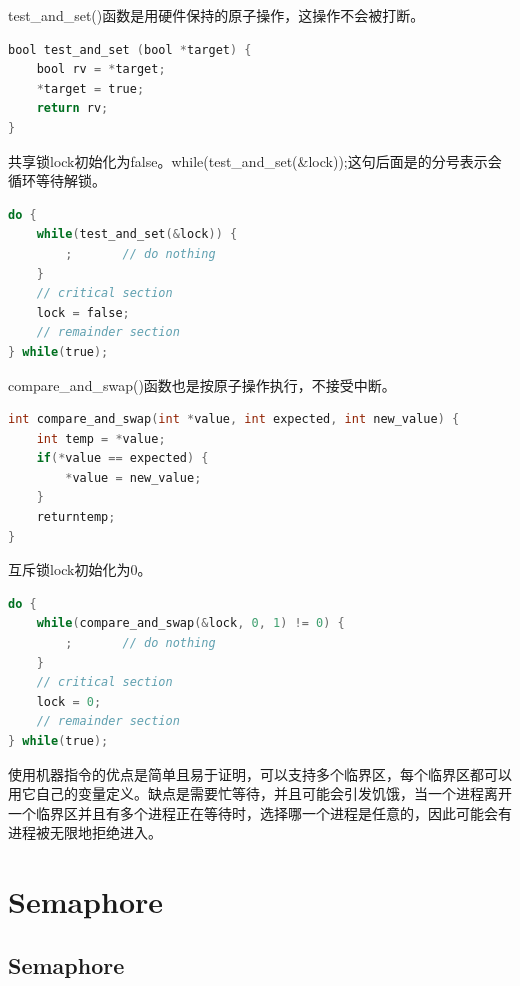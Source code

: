 test\_and\_set()函数是用硬件保持的原子操作，这操作不会被打断。

\vspace{-0.5cm}

\begin{lstlisting}[language=C]
bool test_and_set (bool *target) {
	bool rv = *target;
	*target = true;
	return rv;
}
\end{lstlisting}

共享锁lock初始化为false。while(test\_and\_set(\&lock));这句后面是的分号表示会循环等待解锁。

\vspace{-0.5cm}

\begin{lstlisting}[language=C]
do {
	while(test_and_set(&lock)) {
		;		// do nothing
	}
	// critical section
	lock = false;
	// remainder section
} while(true);
\end{lstlisting}

compare\_and\_swap()函数也是按原子操作执行，不接受中断。

\vspace{-0.5cm}

\begin{lstlisting}[language=C]
int compare_and_swap(int *value, int expected, int new_value) {
	int temp = *value;
	if(*value == expected) {
		*value = new_value;
	}
	returntemp;
}
\end{lstlisting}

互斥锁lock初始化为0。

\vspace{-0.5cm}

\begin{lstlisting}[language=C]
do {
	while(compare_and_swap(&lock, 0, 1) != 0) {
		;		// do nothing
	}
	// critical section
	lock = 0;
	// remainder section
} while(true);
\end{lstlisting}

使用机器指令的优点是简单且易于证明，可以支持多个临界区，每个临界区都可以用它自己的变量定义。缺点是需要忙等待，并且可能会引发饥饿，当一个进程离开一个临界区并且有多个进程正在等待时，选择哪一个进程是任意的，因此可能会有进程被无限地拒绝进入。

\newpage

\section{Semaphore}

\subsection{Semaphore}

